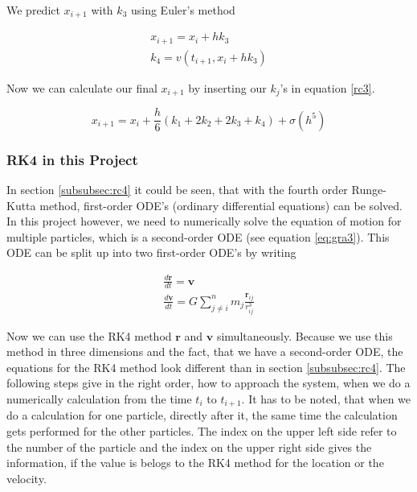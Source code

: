 \documentclass[10pt,a4paper]{article}
\begin{document}
We predict $x_{i+1}$ with $k_3$ using Euler's method

\begin{align}
x_{i+1} = x_i + h k_3 \\
k_4 = v(t_{i+1}, x_i + h k_3)
\end{align}

Now we can calculate our final $x_{i+1}$ by inserting our $k_j$'s in equation \eqref{rc3}.

\begin{equation}
\label{rc9}
x_{i+1} =  x_i + \frac{h}{6} (k_1 + 2 k_2 + 2 k_3 + k_4) + \sigma(h^5)
\end{equation}

\subsubsection{RK4 in this Project}

In section \ref{subsubsec:rc4} it could be seen, that with the fourth order Runge-Kutta method, first-order ODE's (ordinary differential equations) can be solved. In this project however, we need to numerically solve the equation of motion for multiple particles, which is a second-order ODE (see equation \eqref{eq:gra3}). This ODE can be split up into two first-order ODE's by writing

\begin{align}
\frac{d\mathbf{r}}{dt} = \mathbf{v}  \\
\frac{d\mathbf{v}}{dt} = G \sum_{j \neq i}^{n} m_j \frac{\mathbf{r}_{ij}}{r_{ij}^3}
\end{align}

Now we can use the RK4 method $\mathbf{r}$ and $\mathbf{v}$ simultaneously. Because we use this method in three dimensions and the fact, that we have a second-order ODE, the equations for the RK4 method look different than in section \ref{subsubsec:rc4}. The following steps give in the right order, how to approach the system, when we do a numerically calculation from the time $t_i$ to $t_{i+1}$. It has to be noted, that when we do a calculation for one particle, directly after it, the same time the calculation gets performed for the other particles. The index on the upper left side refer to the number of the particle and the index on the upper right side gives the information, if the value is belogs to the RK4 method for the location or the velocity.
\end{document}
